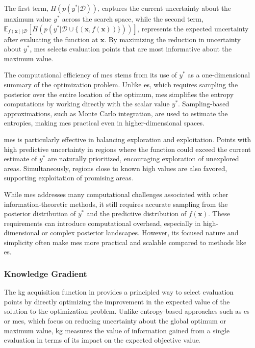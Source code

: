 The first term, $H(p(y^*|\mathcal{D}))$, captures the current uncertainty about the maximum value $y^*$ across the search space, while the second term, $\mathbb{E}_{f(\mathbf{x})|\mathcal{D}} \left[ H(p(y^*|\mathcal{D} \cup \{(\mathbf{x}, f(\mathbf{x}))\})) \right]$, represents the expected uncertainty after evaluating the function at $\mathbf{x}$. By maximizing the reduction in uncertainty about $y^*$, \ac{mes} selects evaluation points that are most informative about the maximum value.

The computational efficiency of \ac{mes} stems from its use of $y^*$ as a one-dimensional summary of the optimization problem. Unlike \ac{es}, which requires sampling the posterior over the entire location of the optimum, \ac{mes} simplifies the entropy computations by working directly with the scalar value $y^*$. Sampling-based approximations, such as Monte Carlo integration, are used to estimate the entropies, making \ac{mes} practical even in higher-dimensional spaces.

\ac{mes} is particularly effective in balancing exploration and exploitation. Points with high predictive uncertainty in regions where the function could exceed the current estimate of $y^*$ are naturally prioritized, encouraging exploration of unexplored areas. Simultaneously, regions close to known high values are also favored, supporting exploitation of promising areas.

While \ac{mes} addresses many computational challenges associated with other information-theoretic methods, it still requires accurate sampling from the posterior distribution of $y^*$ and the predictive distribution of $f(\mathbf{x})$. These requirements can introduce computational overhead, especially in high-dimensional or complex posterior landscapes. However, its focused nature and simplicity often make \ac{mes} more practical and scalable compared to methods like \ac{es}.
\subsubsection{Knowledge Gradient}
\label{section:knowledge_gradient}

The \acf{kg} acquisition function in \citet{frazier2008knowledge, wu2016parallel} provides a principled way to select evaluation points by directly optimizing the improvement in the expected value of the solution to the optimization problem. Unlike entropy-based approaches such as \ac{es} or \ac{mes}, which focus on reducing uncertainty about the global optimum or maximum value, \ac{kg} measures the value of information gained from a single evaluation in terms of its impact on the expected objective value.

